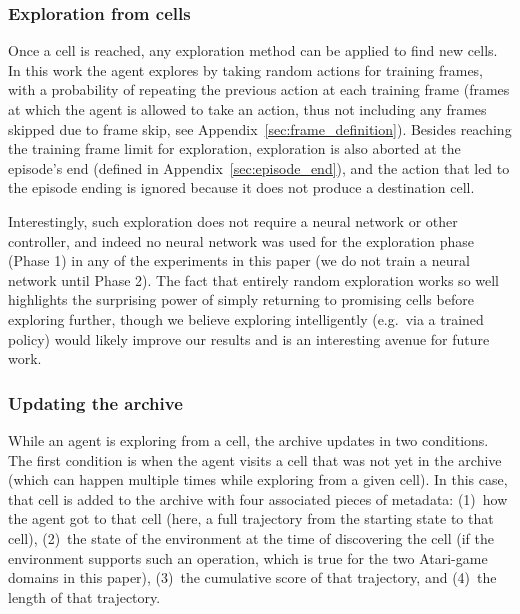 \documentclass{article}
\begin{document}
\subsubsection{Exploration from cells}
\label{sec:explore_from_cell}

Once a cell is reached, any exploration method can be applied to find new cells. In this work the agent explores by taking random actions for  training frames, with a  probability of repeating the previous action at each training frame (frames at which the agent is allowed to take an action, thus not including any frames skipped due to frame skip, see Appendix~\ref{sec:frame_definition}).
Besides reaching the  training frame limit for exploration, exploration is also aborted at the episode's end (defined in Appendix~\ref{sec:episode_end}), and the action that led to the episode ending is ignored because it does not produce a destination cell.

Interestingly, such exploration does not require a neural network or other controller, and indeed no neural network was used for the exploration phase (Phase 1) in any of the experiments in this paper (we do not train a neural network until Phase 2). The fact that entirely random exploration works so well highlights the surprising power of simply returning to promising cells before exploring further, though we believe exploring intelligently (e.g.\ via a trained policy) would likely improve our results and is an interesting avenue for future work.

\subsubsection{Updating the archive}
\label{sec:update_the_archive}

While an agent is exploring from a cell, the archive updates in two conditions. The first condition is when the agent visits a cell that was not yet in the archive (which can happen multiple times while exploring from a given cell). In this case, that cell is added to the archive with four associated pieces of metadata: (1)~how the agent got to that cell (here, a full trajectory from the starting state to that cell), (2)~the state of the environment at the time of discovering the cell (if the environment supports such an operation, which is true for the two Atari-game domains in this paper), (3)~the cumulative score of that trajectory, and (4)~the length of that trajectory. 
\end{document}
